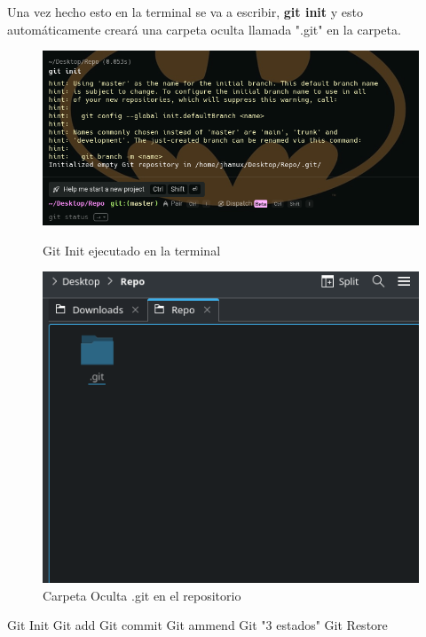 Una vez hecho esto en la terminal se va a escribir, \textbf{git init} y esto automáticamente creará una carpeta oculta llamada ".git" en la carpeta.\\
\begin{figure}[h!]
	\centering
	\includegraphics[scale = 0.7]{Images/gitinit}
	\caption{Git Init ejecutado en la terminal}
	
	\includegraphics[scale = 0.7]{Images/dotgit}
	\caption{Carpeta Oculta .git en el repositorio}
\end{figure}


Git Init
Git add
Git commit
Git ammend
Git "3 estados"
Git Restore